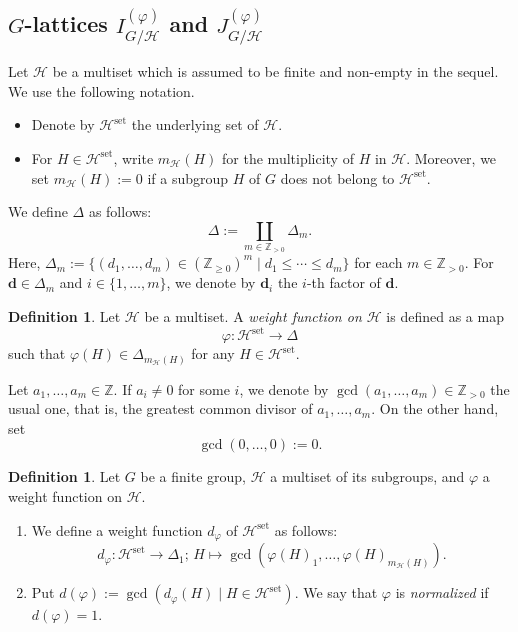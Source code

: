 \documentclass[12pt]{amsart}
\theoremstyle{plain}
\theoremstyle{definition}
\newtheorem{dfn}[thm]{Definition}
\numberwithin{thm}{section}
\numberwithin{equation}{section}
\newcommand{\Zpn}{\mathbb{Z}_{>0}}
\newcommand{\Znn}{\mathbb{Z}_{\geq 0}}
\newcommand{\Z}{\mathbb{Z}}
\newcommand{\bd}{\mathbf{d}}
\newcommand{\cH}{\mathcal{H}}
\DeclareMathOperator{\set}{set}
\begin{document}
\subsection{$G$-lattices $I_{G/\cH}^{(\varphi)}$ and $J_{G/\cH}^{(\varphi)}$}\label{ssec:ijdf}

Let $\cH$ be a multiset which is assumed to be finite and non-empty in the sequel. We use the following notation. 
\begin{itemize}
\item Denote by $\cH^{\set}$ the underlying set of $\cH$. 
\item For $H\in \cH^{\set}$, write $m_{\cH}(H)$ for the multiplicity of $H$ in $\cH$. Moreover, we set $m_{\cH}(H):=0$ if a subgroup $H$ of $G$ does not belong to $\cH^{\set}$. 
\end{itemize}

We define $\Delta$ as follows:
\begin{equation*}
    \Delta :=\coprod_{m \in \Zpn} \Delta_{m}. 
\end{equation*}
Here, $\Delta_{m}:=\{(d_{1},\ldots,d_{m})\in (\Znn)^{m}\mid d_{1}\leq \cdots \leq d_{m}\}$ for each $m\in \Zpn$. 
For $\bd \in \Delta_{m}$ and $i\in \{1,\ldots,m\}$, we denote by $\bd_{i}$ the $i$-th factor of $\bd$. 

\begin{dfn}
Let $\cH$ be a multiset. A \emph{weight function on $\cH$} is defined as a map
\begin{equation*}
\varphi \colon \cH^{\set}\rightarrow \Delta
\end{equation*}
such that $\varphi(H)\in \Delta_{m_{\cH}(H)}$ for any $H\in \cH^{\set}$. 
\end{dfn}

Let $a_{1},\ldots,a_{m}\in \Z$. If $a_{i}\neq 0$ for some $i$, we denote by $\gcd(a_{1},\ldots,a_{m})\in \Zpn$ the usual one, that is, the greatest common divisor of $a_{1},\ldots,a_{m}$. On the other hand, set
\begin{equation*}
\gcd(0,\ldots,0):=0. 
\end{equation*}

\begin{dfn}\label{dfn:dfdp}
Let $G$ be a finite group, $\cH$ a multiset of its subgroups, and $\varphi$ a weight function on $\cH$. 
\begin{enumerate}
\item We define a weight function $d_{\varphi}$ of $\cH^{\set}$ as follows: 
\begin{equation*}
d_{\varphi}\colon \cH^{\set} \rightarrow \Delta_{1};\,H \mapsto 
\gcd(\varphi(H)_{1},\ldots,\varphi(H)_{m_{\cH}(H)}). 
\end{equation*}
\item Put $d(\varphi):=\gcd(d_{\varphi}(H)\mid H\in \cH^{\set})$. We say that $\varphi$ is \emph{normalized} if $d(\varphi)=1$. 
\end{enumerate}
\end{dfn}
\end{document}
